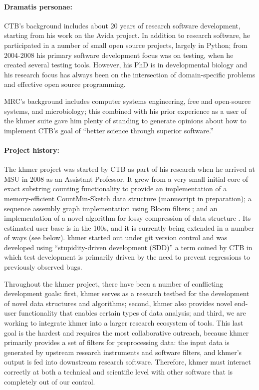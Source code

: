 \documentclass[11pt]{article}
\begin{document}
\paragraph{Dramatis personae:}
CTB's background includes about 20 years of research software development,
starting from his work on the Avida project. \cite{wiki:avida}
\cite{adami1994evolutionary}  In addition to research software, he participated
in a number of small open source projects, largely in Python; from 2004-2008
his primary software development focus was on testing, when he created several
testing tools.  However, his PhD is in developmental biology and his research
focus has always been on the intersection of domain-specific problems and
effective open source programming.

MRC's background includes computer systems engineering, free and open-source
systems, and microbiology; this combined with his prior experience as a user of
the khmer suite gave him plenty of standing to generate opinions about how to
implement CTB's goal of ``better science through superior software.''
\cite{slideshare:cloud-analysis2012}

\paragraph{Project history:}
The khmer project was started by CTB as part of his research when he
arrived at MSU in 2008 as an Assistant Professor.  It grew from a very
small initial core of exact substring counting functionality to
provide an implementation of a memory-efficient CountMin-Sketch data
structure (manuscript in preparation); a sequence assembly graph
implementation using Bloom filters \cite{kmer-percolation}; and an
implementation of a novel algorithm for lossy compression of data
structure \cite{diginorm}.  Its estimated user base is in the 100s,
and it is currently being extended in a number of ways (see below).
khmer started out under git version control and was developed using
``stupidity-driven development (SDD)'' a term coined by CTB in which test
development is primarily driven by the need to prevent regressions to
previously observed bugs.

Throughout the khmer project, there have been a number of conflicting
development goals: first, khmer serves as a research testbed for the
development of novel data structures and algorithms; second, khmer
also provides novel end-user functionality that enables certain types
of data analysis; and third, we are working to integrate khmer into a
larger research ecosystem of tools.  This last goal is the hardest
and requires the most collaborative outreach, because khmer
primarily provides a set of filters for preprocessing data: the input
data is generated by upstream research instruments and software
filters, and khmer's output is fed into downstream research software.
Therefore, khmer must interact correctly at both a technical and
scientific level with other software that is completely out of our
control.
\end{document}
